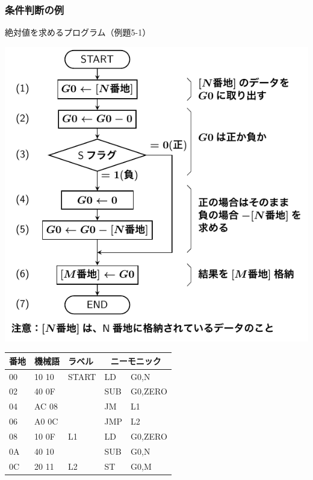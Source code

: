 \documentclass{beamer}                 %
\begin{document}
\begin{frame}
  \frametitle{条件判断の例}
  絶対値を求めるプログラム（例題5-1）\\
  \vfill
  \begin{minipage}{0.49\columnwidth}
    \centerline{\includegraphics[scale=0.5]{../Tikz/flow1.pdf}}
  \end{minipage}
  \begin{minipage}{0.5\columnwidth}
    {\ttfamily\scriptsize\begin{center}
      \begin{tabular}{|l|l|l|l l|}
        \hline
        番地 & 機械語 & ラベル & \multicolumn{2}{|c|}{ニーモニック} \\
        \hline
        00 & 10 10 & START& LD   & G0,N    \\
        02 & 40 0F &      & SUB  & G0,ZERO \\
        04 & AC 08 &      & JM   & L1      \\
        06 & A0 0C &      & JMP  & L2      \\
        08 & 10 0F & L1   & LD   & G0,ZERO \\
        0A & 40 10 &      & SUB  & G0,N    \\
        0C & 20 11 & L2   & ST   & G0,M    \\

\end{tabular}
\end{center}}
\end{minipage}
\end{frame}
\end{document}
